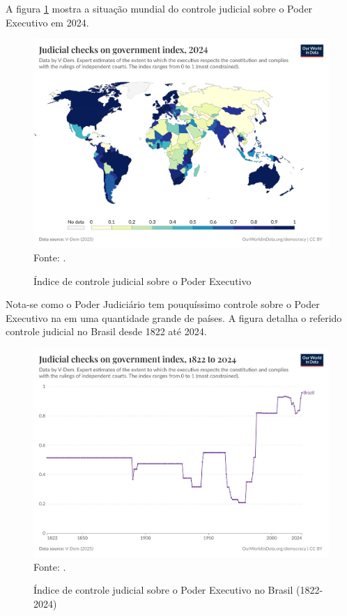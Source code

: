 A figura \ref{fig:judicial-constraints-on-the-executive-index} mostra a situação mundial do controle judicial sobre o Poder Executivo em 2024.

\begin{figure}[H]
	\centering
	\caption{Índice de controle judicial sobre o Poder Executivo}
	\includegraphics[width=1\linewidth]{figuras/judicial-constraints-on-the-executive-index.png}
	\label{fig:judicial-constraints-on-the-executive-index}
	\footnotesize{Fonte: \cite{jus_constraints_on_gov}.}
\end{figure}

Nota-se como o Poder Judiciário tem pouquíssimo controle sobre o Poder Executivo na em uma quantidade grande de países. A figura detalha o referido controle judicial no Brasil desde 1822 até 2024.

\begin{figure}[H]
    \centering
    \caption{Índice de controle judicial sobre o Poder Executivo no Brasil (1822-2024)}
    \includegraphics[width=1\linewidth]{figuras/judicial-constraints-on-the-executive-index-brazil.png}
    \label{fig:judicial-constraints-on-the-executive-index-brazil}
    \footnotesize{Fonte: \cite{jus_constraints_on_gov}.}
\end{figure}

